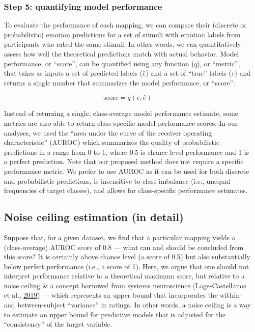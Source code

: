 \documentclass[11pt,american,a4paper,oneside,]{memoir} %
\begin{document}
\hypertarget{step-5-quantifying-model-performance}{%
\subsubsection{Step 5: quantifying model performance}\label{step-5-quantifying-model-performance}}

To evaluate the performance of each mapping, we can compare their (discrete or probabilistic) emotion predictions for a set of stimuli with emotion labels from participants who rated the same stimuli. In other words, we can quantitatively assess how well the theoretical predictions match with actual behavior. Model performance, or ``score'', can be quantified using any function (\(q\)), or ``metric'', that takes as inputs a set of predicted labels (\(\hat{e}\)) and a set of ``true'' labels (\(e\)) and returns a single number that summarizes the model performance, or ``score'':

\begin{equation}
\mathrm{score} = q(e, \hat{e})
\end{equation}

Instead of returning a single, class-average model performance estimate, some metrics are also able to return class-specific model performance scores. In our analyses, we used the ``area under the curve of the receiver operating characteristic'' (AUROC) which summarizes the quality of probabilistic predictions in a range from 0 to 1, where 0.5 is chance level performance and 1 is a perfect prediction. Note that our proposed method does not require a specific performance metric. We prefer to use AUROC as it can be used for both discrete and probabilistic predictions, is insensitive to class imbalance (i.e., unequal frequencies of target classes), and allows for class-specific performance estimates.

\hypertarget{hka-noise-ceiling-detail}{%
\subsection{Noise ceiling estimation (in detail)}\label{hka-noise-ceiling-detail}}

Suppose that, for a given dataset, we find that a particular mapping yields a (class-average) AUROC score of 0.8 --- what can and should be concluded from this score? It is certainly above chance level (a score of 0.5) but also substantially below perfect performance (i.e., a score of 1). Here, we argue that one should not interpret performance relative to a theoretical maximum score, but relative to a noise ceiling \& a concept borrowed from systems neuroscience (Lage-Castellanos et al., \protect\hyperlink{ref-lage2019methods}{2019}) --- which represents an upper bound that incorporates the within- and between-subject ``variance'' in ratings. In other words, a noise ceiling is a way to estimate an upper bound for predictive models that is adjusted for the ``consistency'' of the target variable.
\end{document}
